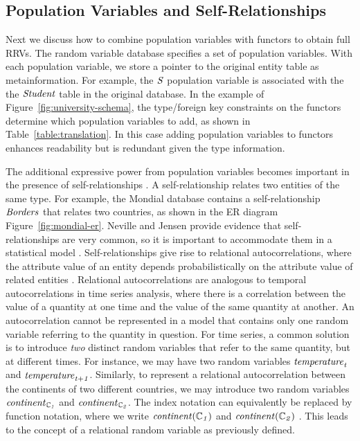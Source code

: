 \documentclass{acm_proc_article-sp}
\begin{document}


\subsection{Population Variables and Self-Relationships}

Next we discuss how to combine population variables with functors to obtain full RRVs. The random variable database specifies a set of population variables. With each population variable, we store a pointer to the original entity table as metainformation. For example, the $\it{S}$ population variable is associated with the the $\it{Student}$ table in the original database. 
In the example of Figure~\ref{fig:university-schema}, the type/foreign key constraints on the functors determine which population variables to add, as shown in Table~\ref{table:translation}. In this case adding population variables to functors enhances readability but is redundant given the type information. 

The additional expressive power from population variables becomes important in the presence of self-relationships \cite{Heckerman+al:SRL07}. 
A self-relationship relates two entities of the same type.
For example, the Mondial database contains a self-relationship $\it{Borders}$ that relates two countries, as shown in the ER diagram Figure~\ref{fig:mondial-er}. Neville and Jensen provide evidence that self-relationships are very common, so it is important to accommodate them in a statistical model \cite{Neville2007}. Self-relationships give rise to relational autocorrelations, where the attribute value of an entity depends probabilistically on the attribute value of related entities \cite{Neville2007}. 
Relational autocorrelations are analogous to temporal autocorrelations in time series analysis, where there is a correlation between the value of a quantity at one time and the value of the same quantity at another. An autocorrelation cannot be represented in a model that contains only one random variable referring to the quantity in question. For time series, a common solution is to introduce {\em two} distinct random variables  that refer to the same quantity, but at different times. For instance, we may have two random variables $\it{temperature}_{t}$ and $\it{temperature}_{t+1}$. Similarly, to represent a relational autocorrelation between the continents of two different countries, we may introduce two random variables $\it{continent}_{\mathbb{C}_{1}}$ and $\it{continent}_{\mathbb{C}_{2}}$. The index notation can equivalently be replaced by function notation, where we write $\it{continent}(\mathbb{C}_{1})$ and $\it{continent}(\mathbb{C}_{2})$ \cite{Milch2007}. This leads to the concept of a relational random variable as previously defined. 
\end{document}
